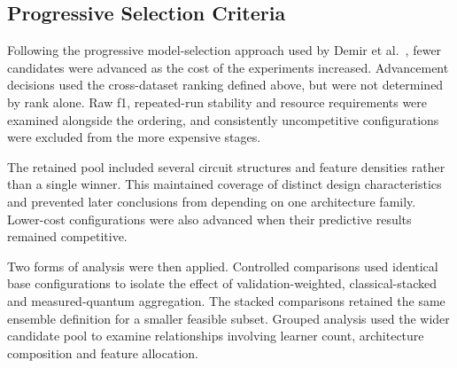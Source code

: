 \documentclass[]{UCD_CS_MSc_AAI_Report}
\begin{document}
\subsection{Progressive Selection Criteria}
\label{sec:method-progressive-selection}

Following the progressive model-selection approach used by Demir et al.~\cite{demir_modified_2018}, fewer candidates were advanced as the cost of the experiments increased. Advancement decisions used the cross-dataset ranking defined above, but were not determined by rank alone. Raw \acl{f1}, repeated-run stability and resource requirements were examined alongside the ordering, and consistently uncompetitive configurations were excluded from the more expensive stages.

The retained pool included several circuit structures and feature densities rather than a single winner. This maintained coverage of distinct design characteristics and prevented later conclusions from depending on one architecture family. Lower-cost configurations were also advanced when their predictive results remained competitive.

Two forms of analysis were then applied. Controlled comparisons used identical base configurations to isolate the effect of validation-weighted, classical-stacked and measured-quantum aggregation. The stacked comparisons retained the same ensemble definition for a smaller feasible subset. Grouped analysis used the wider candidate pool to examine relationships involving learner count, architecture composition and feature allocation.


\end{document}
